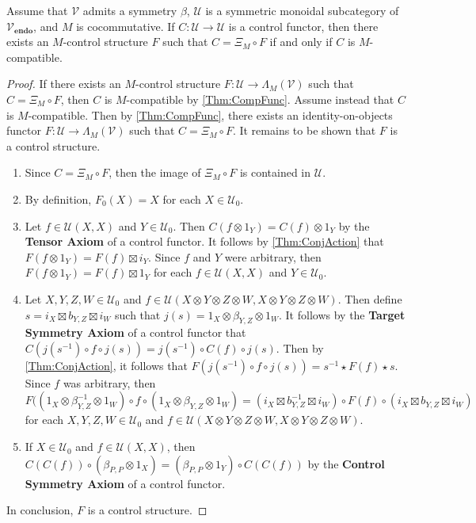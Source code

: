 \begin{thm}
    \label{Thm:CompatibleControls}
    Assume that $\mathcal{V}$ admits a symmetry $\beta$, $\mathcal{U}$ is a symmetric monoidal subcategory of $\mathcal{V}_{\mathbf{endo}}$, and $M$ is cocommutative.
    If $C: \mathcal{U} \to \mathcal{U}$ is a control functor, then there exists an $M$-control structure $F$ such that $C = \Xi_M \circ F$ if and only if $C$ is $M$-compatible.
\end{thm}

\begin{proof}
    If there exists an $M$-control structure $F: \mathcal{U} \to \Lambda_M( \mathcal{V} )$ such that $C = \Xi_M \circ F$, then $C$ is $M$-compatible by \cref{Thm:CompFunc}.
    Assume instead that $C$ is $M$-compatible.
    Then by \cref{Thm:CompFunc}, there exists an identity-on-objects functor $F: \mathcal{U} \to \Lambda_M( \mathcal{V} )$ such that $C = \Xi_M \circ F$.
    It remains to be shown that $F$ is a control structure.
    \begin{enumerate}
    \item Since $C = \Xi_M \circ F$, then the image of $\Xi_M \circ F$ is contained in $\mathcal{U}$.
    \item By definition, $F_0( X ) = X$ for each $X \in \mathcal{U}_0$.
    \item Let $f \in \mathcal{U}( X, X )$ and $Y \in \mathcal{U}_0$.
          Then $C( f \otimes 1_Y ) = C( f ) \otimes 1_Y$ by the \textbf{Tensor Axiom} of a control functor.
          It follows by \cref{Thm:ConjAction} that $F( f \otimes 1_Y ) = F( f ) \boxtimes i_Y$.
          Since $f$ and $Y$ were arbitrary, then $F( f \otimes 1_Y ) = F( f ) \boxtimes 1_Y$ for each $f \in \mathcal{U}( X, X )$ and $Y \in \mathcal{U}_0$.
    \item Let $X, Y, Z, W \in \mathcal{U}_0$ and $f \in \mathcal{U}( X \otimes Y \otimes Z \otimes W, X \otimes Y \otimes Z \otimes W )$.
          Then define $s = i_X \boxtimes b_{Y,Z} \boxtimes i_W$ such that $j( s ) = 1_X \otimes \beta_{Y,Z} \otimes 1_W$.
          It follows by the \textbf{Target Symmetry Axiom} of a control functor that $C( j( s^{-1} ) \circ f \circ j( s ) ) = j( s^{-1} ) \circ C( f ) \circ j( s )$.
          Then by \cref{Thm:ConjAction}, it follows that $F( j( s^{-1} ) \circ f \circ j( s ) ) = s^{-1} \star F( f ) \star s$.
          Since $f$ was arbitrary, then $F( ( 1_X \otimes \beta_{Y,Z}^{-1} \otimes 1_W ) \circ f \circ ( 1_X \otimes \beta_{Y,Z} \otimes 1_W ) = ( i_X \boxtimes b_{Y,Z}^{-1} \boxtimes i_W ) \circ F( f ) \circ ( i_X \boxtimes b_{Y,Z} \boxtimes i_W )$ for each $X, Y, Z, W \in \mathcal{U}_0$ and $f \in \mathcal{U}( X \otimes Y \otimes Z \otimes W, X \otimes Y \otimes Z \otimes W )$. 
    \item If $X \in \mathcal{U}_0$ and $f \in \mathcal{U}( X, X )$, then $C( C( f ) ) \circ ( \beta_{P,P} \otimes 1_X ) = ( \beta_{P,P} \otimes 1_Y ) \circ C( C( f ) )$ by the \textbf{Control Symmetry Axiom} of a control functor.
    \end{enumerate}
    In conclusion, $F$ is a control structure.
\end{proof}

